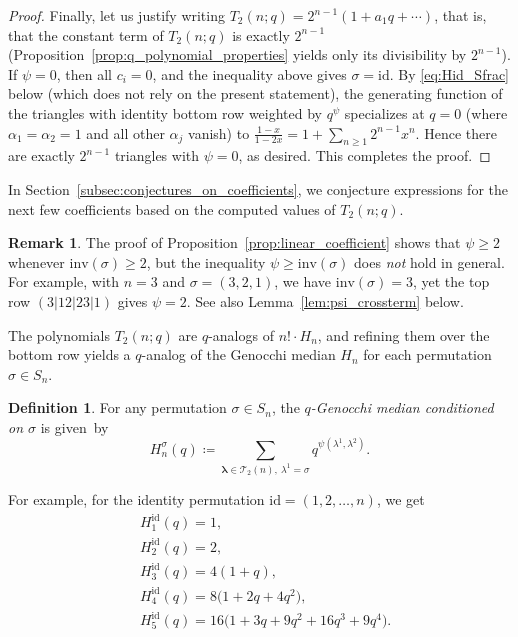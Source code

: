 \documentclass[pdftex]{sigma}
\numberwithin{equation}{section}
\theoremstyle{definition}
\newtheorem{Definition}[Theorem]{Definition}
\newtheorem{Remark}[Theorem]{Remark}
\begin{document}
\begin{proof}
	Finally, let us justify writing $T_2(n;q)=2^{n-1}(1+a_1q+\cdots)$, that
	is, that the constant term of $T_2(n;q)$ is exactly $2^{n-1}$
	(Proposition~\ref{prop:q_polynomial_properties} yields only its divisibility by
	$2^{n-1}$).
	If $\psi=0$, then all $c_i=0$, and the inequality above gives
	$\sigma=\mathrm{id}$.
	By \eqref{eq:Hid_Sfrac} below
	(which does not rely on the present statement),
	the generating function of the triangles
	with identity bottom row weighted by $q^{\psi}$ specializes at $q=0$
	(where $\alpha_1=\alpha_2=1$ and all other $\alpha_j$ vanish) to
	$\frac{1-x}{1-2x}=1+\sum_{n\ge1}2^{n-1}x^{n}$.
	Hence there are exactly $2^{n-1}$ triangles with $\psi=0$, as desired.
	This completes the proof.
\end{proof}

In Section~\ref{subsec:conjectures_on_coefficients}, we conjecture expressions
for the next few coefficients based on the computed values of $T_2(n;q)$.
\begin{Remark}
	\label{rem:psi_vs_inv} The proof of Proposition~\ref{prop:linear_coefficient} shows
	that $\psi \ge 2$ whenever $\mathrm{inv}(\sigma) \ge 2$, but the inequality
	$\psi \ge \mathrm{inv}(\sigma)$ does \emph{not} hold in general.
	For example, with $n=3$ and $\sigma = (3,2,1)$, we have
	$\mathrm{inv}(\sigma) = 3$, yet the top row $(3|12|23|1)$ gives $\psi = 2$.
	See also Lemma~\ref{lem:psi_crossterm} below.
\end{Remark}

The polynomials $T_2(n;q)$ are $q$-analogs of $n! \cdot H_n$, and refining them
over the bottom row yields a $q$-analog of the Genocchi median $H_n$ for each
permutation $\sigma\in S_n$.

\begin{Definition}
	\label{def:H_sigma} For any permutation $\sigma \in S_n$, the
	\emph{$q$-Genocchi median conditioned on $\sigma$} is given~by
	\begin{equation*}
		H_n^\sigma(q) \coloneqq \sum_{\boldsymbol\lambda \in
		\mathcal{T}_2(n),\ \lambda^1 = \sigma} q^{\psi(\lambda^1, \lambda^2)}.
	\end{equation*}
\end{Definition}

For example, for the identity permutation $\mathrm{id} = (1,2,\dots,n)$, we
get
\begin{align*}
	&H_1^{\mathrm{id}}(q)= 1, \\
	&H_2^{\mathrm{id}}(q)= 2, \\
	&H_3^{\mathrm{id}}(q)= 4(1+q), \\
	&H_4^{\mathrm{id}}(q)= 8\bigl(1+  2q + 4q^2\bigr), \\
	&H_5^{\mathrm{id}}(q)= 16\bigl(1 + 3q + 9q^2 + 16q^3 + 9q^4\bigr).
\end{align*}
\end{document}
